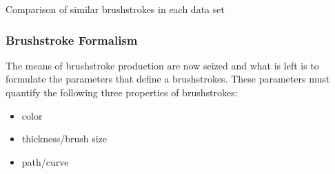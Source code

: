\begin{marginfigure}
{        %
    }\qquad
    \qquad
    \caption{Comparison of similar brushstrokes in each data set}
\end{marginfigure}

\subsubsection{Brushstroke Formalism}
The means of brushstroke production are now seized and what is left is to formulate the parameters that define a brushstrokes.
These parameters must quantify the following three properties of brushstrokes:
\begin{itemize}
    \item color
    \item thickness/brush size
    \item path/curve
\end{itemize}

